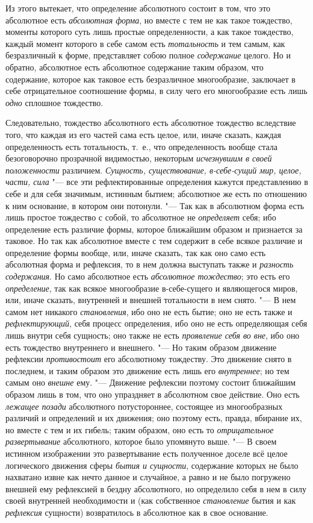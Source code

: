 Из этого вытекает, что определение абсолютного состоит в том, что это
абсолютное есть {\em абсолютная форма}, но вместе с тем
не как такое тождество, моменты которого суть лишь простые определенности,
а как такое тождество, каждый момент которого в себе самом есть
{\em тотальность} и тем самым, как безразличный к
форме, представляет собою полное {\em содержание}
целого. Но и обратно, абсолютное есть абсолютное содержание таким образом,
что содержание, которое как таковое есть безразличное многообразие,
заключает в себе отрицательное соотношение формы, в силу чего его
многообразие есть лишь {\em одно} сплошное тождество.

Следовательно, тождество абсолютного есть абсолютное тождество вследствие
того, что каждая из его частей сама есть целое, или, иначе сказать, каждая
определенность есть тотальность, т.~е., что определенность вообще стала
безоговорочно прозрачной видимостью, некоторым
{\em исчезнувшим в своей положенности} различием.
{\em Сущность, существование, в-себе-сущий мир, целое,
части, сила} "--- все эти рефлектированные определения кажутся представлению в
себе и для себя значимым, истинным бытием; абсолютное же есть по отношению
к ним основание, в котором они потонули. "--- Так как в абсолютном форма есть
лишь простое тождество с собой, то абсолютное не
{\em определяет} себя; ибо определение есть различие
формы, которое ближайшим образом и признается за таковое. Но так как
абсолютное вместе с тем содержит в себе всякое различие и определение формы
вообще, или, иначе сказать, так как оно само есть абсолютная форма и
рефлексия, то в нем должна выступать также и
{\em разность содержания}. Но само абсолютное есть
{\em абсолютное тождество}; это есть его
{\em определение}, так как всякое многообразие
в-себе-сущего и являющегося миров, или, иначе сказать, внутренней и внешней
тотальности в нем снято. "--- В нем самом нет никакого
{\em становления}, ибо оно не есть бытие; оно не есть
также и {\em рефлектирующий}, себя процесс определения,
ибо оно не есть определяющая себя лишь внутри себя сущность; оно также не
есть {\em проявление себя во вне}, ибо оно есть
тождество внутреннего и внешнего. "--- Но таким образом движение рефлексии
{\em противостоит} его абсолютному тождеству. Это
движение снято в последнем, и таким образом это движение есть лишь его
{\em внутреннее}; но тем самым оно
{\em внешне} ему. "--- Движение рефлексии поэтому состоит
ближайшим образом лишь в том, что оно упраздняет в абсолютном свое
действие. Оно есть {\em лежащее позади} абсолютного
потустороннее, состоящее из многообразных различий и определений и их
движения; оно поэтому есть, правда, вбирание их, но вместе с тем и их
гибель; таким образом, оно есть то {\em отрицательное
развертывание} абсолютного, которое было упомянуто выше. "--- В своем истинном
изображении это развертывание есть полученное доселе всё целое логического
движения сферы {\em бытия и сущности}, содержание
которых не было нахватано извне как нечто данное и случайное, а равно и не
было погружено внешней ему рефлексией в бездну абсолютного, но определило
себя в нем в силу своей внутренней необходимости и (как собственное
{\em становление} бытия и как
{\em рефлексия} сущности) возвратилось в абсолютное как
в свое основание.

